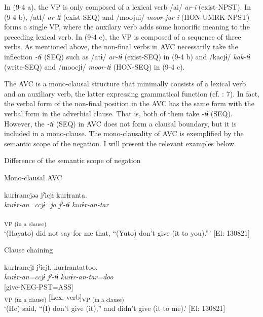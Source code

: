 In (9-4 a), the VP is only composed of a lexical verb /ai/ \textit{ar-i} (exist-NPST). In (9-4 b), /atɨ/ \textit{ar-tɨ} (exist-SEQ) and /moojui/ \textit{moor-jur-i} (HON-UMRK-NPST) forms a single VP, where the auxilary verb adds some honorific meaning to the preceding lexical verb. In (9-4 c), the VP is composed of a sequence of three verbs. As mentioned above, the non-final verbs in AVC necessarily take the inflection \textit{{}-tɨ} (SEQ) such as /atɨ/ \textit{ar-tɨ} (exist-SEQ) in (9-4 b) and /kacjɨ/ \textit{kak-tɨ} (write-SEQ) and /moocjɨ/ \textit{moor-tɨ} (HON-SEQ) in (9-4 c).

  The AVC is a mono-clausal structure that minimally consists of a lexical verb and an auxiliary verb, the latter expressing grammatical function (cf. \citealt{Anderson2006}: 7). In fact, the verbal form of the non-final position in the AVC has the same form with the verbal form in the adverbial clause. That is, both of them take \textit{{}-tɨ} (SEQ). However, the \textit{{}-tɨ} (SEQ) in AVC does not form a clausal boundary, but it is included in a mono-clause. The mono-clausality of AVC is exemplified by the semantic scope of the negation. I will present the relevant examples below.

\ea   Difference of the semantic scope of negation \label{ex:9.5}

  \ea\label{ex:9.5a} Mono-clausal AVC\\

 \gllll  kurɨrancjəə  jˀicjɨ  kurɨranta.\\
    \textit{kurɨr-an=ccjɨ=ja}  \textit{jˀ-tɨ}  \textit{kurɨr-an{}-tar}\\
    [give-NEG=QT=TOP  say-SEQ  BEN-NEG-PST]\\
    [Complement  Lex. verb  Aux. verb]\textsubscript{VP (in a clause)}\\
    \glt     ‘(Hayato) did not say for me that, “(Yuto) don’t give (it to you).”’ [El: 130821]

  \ex\label{ex:9.5b} Clause chaining\\

 \gllll  kurɨrancjɨ  jˀicjɨ,  kurɨrantattoo.\\
    \textit{kurɨr-an=ccjɨ}  \textit{jˀ-tɨ}  \textit{kurɨr-an{}-tar=doo}\\
    [give-NEG=QT  say-SEQ]  [give-NEG-PST=ASS]\\
    [Complement  Lex. verb]\textsubscript{VP (in a clause)}  [Lex. verb]\textsubscript{VP (in a clause)}\\
    \glt     ‘(He) said, “(I) don’t give (it),” and didn’t give (it to me).’ [El: 130821]
\z
\z


